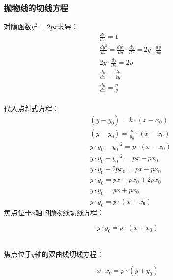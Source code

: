 \documentclass[UTF8]{ctexart}
\begin{document}
\newpage

\subsubsection{抛物线的切线方程}
    对隐函数$y^2=2px$求导：
    \setcounter{equation}{0}
    \begin{align}
        &\frac{dx}{dx}=1\\[4mm]
        &\frac{dy^2}{dx}=\frac{dy^2}{dy}\cdot\frac{dy}{dx}=2y\cdot\frac{dy}{dx}\\[6mm]
        &2y\cdot\frac{dy}{dx}=2p\\[4mm]
        &\frac{dy}{dx}=\frac{2p}{2y}\\[4mm]
        &\frac{dy}{dx}=\frac{p}{y}
    \end{align}\\
    代入点斜式方程：
    \begin{align}
        &(y-y_0)=k\cdot(x-x_0)\\[4mm]
        &(y-y_0)=\frac{p}{y_0}\cdot(x-x_0)\\[4mm]
        &y\cdot y_0-y_0\;^2=p\cdot(x-x_0)\\[4mm]
        &y\cdot y_0-y_0\;^2=px-px_0\\[4mm]
        &y\cdot y_0-2px_0=px-px_0\\[4mm]
        &y\cdot y_0=px-px_0+2px_0\\[4mm]
        &y\cdot y_0=px+px_0\\[4mm]
        &y\cdot y_0=p\cdot(x+x_0)
    \end{align}\vspace{3pt}
    焦点位于$x$轴的抛物线切线方程：
    \begin{large}
        \begin{equation*}
            y\cdot y_0=p\cdot(x+x_0)
        \end{equation*}
    \end{large}\\
    焦点位于$y$轴的双曲线切线方程：
    \begin{large}
        \begin{equation*}
            x\cdot x_0=p\cdot(y+y_0)
        \end{equation*}
    \end{large}

\newpage
\end{document}
